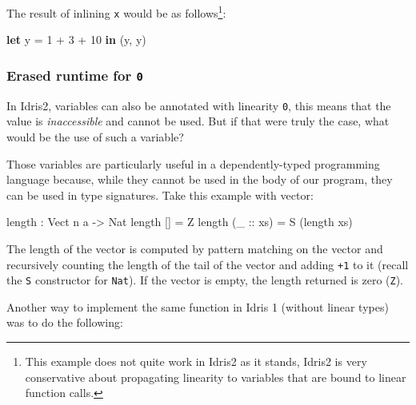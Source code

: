 \documentclass[
]{article}
\newenvironment{Shaded}{}{}
\newcommand{\DataTypeTok}[1]{\textcolor[rgb]{0.56,0.13,0.00}{#1}}
\newcommand{\DecValTok}[1]{\textcolor[rgb]{0.25,0.63,0.44}{#1}}
\newcommand{\FunctionTok}[1]{\textcolor[rgb]{0.02,0.16,0.49}{#1}}
\newcommand{\KeywordTok}[1]{\textcolor[rgb]{0.00,0.44,0.13}{\textbf{#1}}}
\newcommand{\NormalTok}[1]{#1}
\newcommand{\OperatorTok}[1]{\textcolor[rgb]{0.40,0.40,0.40}{#1}}
\newcommand{\OtherTok}[1]{\textcolor[rgb]{0.00,0.44,0.13}{#1}}
\begin{document}
The result of inlining \texttt{x} would be as follows\footnote{This
  example does not quite work in Idris2 as it stands, Idris2 is very
  conservative about propagating linearity to variables that are bound
  to linear function calls.}:

\begin{Shaded}
\begin{Highlighting}[]
\KeywordTok{let}\NormalTok{ y }\OtherTok{=} \DecValTok{1} \OperatorTok{+} \DecValTok{3} \OperatorTok{+} \DecValTok{10} \KeywordTok{in}
\NormalTok{    (y, y)}
\end{Highlighting}
\end{Shaded}

\hypertarget{erased-runtime-for-0}{%
\subsubsection{\texorpdfstring{Erased runtime for
\texttt{0}}{Erased runtime for 0}}\label{erased-runtime-for-0}}

In Idris2, variables can also be annotated with linearity \texttt{0},
this means that the value is \emph{inaccessible} and cannot be used. But
if that were truly the case, what would be the use of such a variable?

Those variables are particularly useful in a dependently-typed
programming language because, while they cannot be used in the body of
our program, they can be used in type signatures. Take this example with
vector:

\begin{Shaded}
\begin{Highlighting}[]
\FunctionTok{length} \OperatorTok{:} \DataTypeTok{Vect}\NormalTok{ n a }\OtherTok{{-}\textgreater{}} \DataTypeTok{Nat}
\FunctionTok{length}\NormalTok{ [] }\OtherTok{=} \DataTypeTok{Z}
\FunctionTok{length}\NormalTok{ (}\OtherTok{\_ ::}\NormalTok{ xs) }\OtherTok{=} \DataTypeTok{S}\NormalTok{ (}\FunctionTok{length}\NormalTok{ xs)}
\end{Highlighting}
\end{Shaded}

The length of the vector is computed by pattern matching on the vector
and recursively counting the length of the tail of the vector and adding
\texttt{+1} to it (recall the \texttt{S} constructor for \texttt{Nat}).
If the vector is empty, the length returned is zero (\texttt{Z}).

Another way to implement the same function in Idris 1 (without linear
types) was to do the following:
\end{document}
